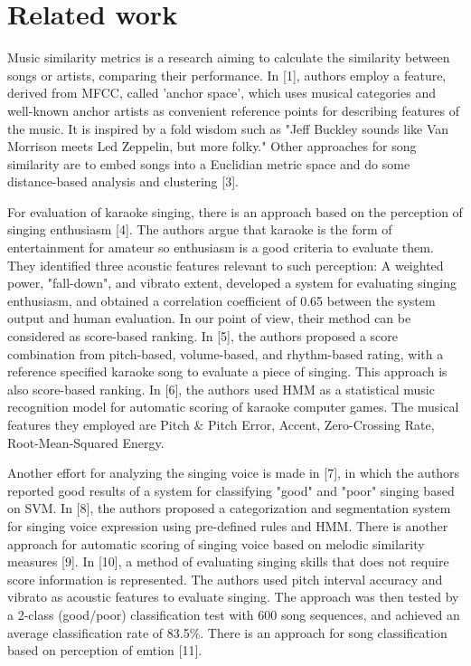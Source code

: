 \documentclass[paper=a4, fontsize=11pt]{scrartcl}
\begin{document}
\section{Related work}
Music similarity metrics is a research aiming to calculate the similarity between songs or artists, comparing their performance. In [1], authors employ a feature, derived from MFCC, called 'anchor space', which uses musical categories and well-known anchor artists as convenient reference points for describing features of the music. It is inspired by a fold wisdom such as "Jeff Buckley sounds like Van Morrison meets Led Zeppelin, but more folky." Other approaches for song similarity are to embed songs into a Euclidian metric space and do some distance-based analysis and clustering [3].

For evaluation of karaoke singing, there is an approach based on the perception of singing enthusiasm [4]. The authors argue that karaoke is the form of entertainment for amateur so enthusiasm is a good criteria to evaluate them. They identified three acoustic features relevant to such perception: A weighted power, "fall-down", and vibrato extent, developed a system for evaluating singing enthusiasm, and obtained a correlation coefficient of 0.65 between the system output and human evaluation. In our point of view, their method can be considered as score-based ranking. In [5], the authors proposed a score combination from pitch-based, volume-based, and rhythm-based rating, with a reference specified karaoke song to evaluate a piece of singing. This approach is also score-based ranking. In [6], the authors used HMM as a statistical music recognition model for automatic scoring of karaoke computer games. The musical features they employed are Pitch \& Pitch Error, Accent, Zero-Crossing Rate, Root-Mean-Squared Energy.

Another effort for analyzing the singing voice is made in [7], in which the authors reported good results of a system for classifying "good" and "poor" singing based on SVM. In [8], the authors proposed a categorization and segmentation system for singing voice expression using pre-defined rules and HMM. There is another approach for automatic scoring of singing voice based on melodic similarity measures [9]. In [10], a method of evaluating singing skills that does not require score information is represented. The authors used pitch interval accuracy and vibrato as acoustic features to evaluate singing. The approach was then tested by a 2-class (good/poor) classification test with 600 song sequences, and achieved an average classification rate of 83.5\%. There is an approach for song classification based on perception of emtion [11].
\end{document}
